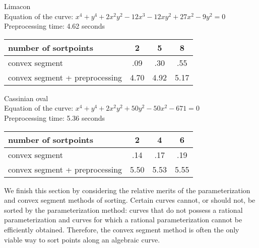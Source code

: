 
\vspace{.2in}

\begin{example}
\label{eg-limacon}
Limacon\\
Equation of the curve: $x^{4} + y^{4} + 2x^{2}y^{2} - 12x^{3} - 12xy^{2} + 27x^{2} - 9y^{2} = 0$\\
Preprocessing time: 4.62\vspace{.5in} seconds\\
%
\begin{tabular}{|l|c|c|c|} \hline
number of sortpoints & 2 & 5 & 8 \\ \hline \hline
convex segment & .09 & .30 & .55 \\ \hline
convex segment + preprocessing & 4.70 & 4.92 & 5.17 \\ \hline
\end{tabular}
\end{example}


\vspace{.2in}

\begin{example}
\label{eg-Cassinian}
Cassinian oval\\
Equation of the curve: $x^{4} + y^{4} + 2x^{2}y^{2} + 50y^{2} - 50x^{2}-671 = 0$\\
Preprocessing time: 5.36\vspace{.5in} seconds\\
%
\begin{tabular}{|l|c|c|c|} \hline
number of sortpoints & 2 & 4 & 6 \\ \hline \hline
convex segment & .14 & .17 & .19 \\ \hline
convex segment + preprocessing & 5.50 & 5.53 & 5.55 \\ \hline
\end{tabular}
\end{example}

\vspace{.2in}

We finish this section by considering the relative merits of the parameterization and 
convex segment methods of sorting.
Certain curves cannot, or should 
not, be sorted by the parameterization method: curves that 
do not possess a rational parameterization and curves for which
a rational parameterization cannot be efficiently obtained.
Therefore, the convex segment method is often 
the only viable way to sort points along an algebraic curve.

